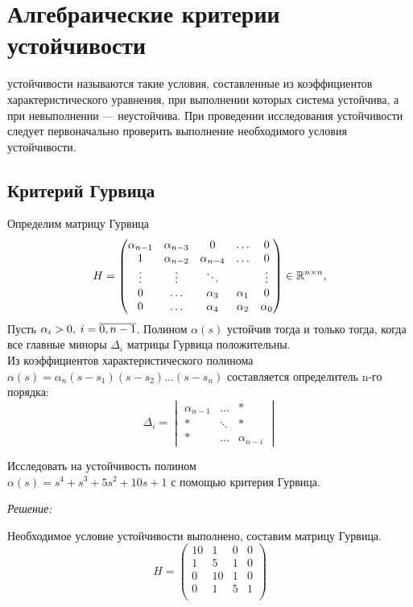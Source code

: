 \documentclass[../../TAU.tex]{subfiles}
\begin{document}
\section{Алгебраические критерии устойчивости}

     устойчивости называются такие  условия, составленные из коэффициентов характеристического уравнения, при выполнении которых система устойчива, а при невыполнении --- неустойчива. При проведении исследования устойчивости следует первоначально проверить выполнение необходимого условия устойчивости.

\subsection{Критерий Гурвица}

    Определим матрицу Гурвица
    $$
        H =\begin{pmatrix}
            \alpha_{n-1} & \alpha_{n-3} & 0 & \ldots & 0 \\
            1 & \alpha_{n-2} & \alpha_{n-4} & \ldots & 0 \\
            \vdots & \vdots & \ddots && \vdots \\
            0 & \ldots & \alpha_{3} & \alpha_1 & 0 \\
            0 & \ldots & \alpha_4 & \alpha_2 & \alpha_0
        \end{pmatrix}\in\mathbb{R}^{n\times n},
    $$
    \theor[Гурвица] Пусть 
    $\alpha_i>0,\; i=\overline{0,n-1}$.
    Полином $\alpha(s)$ устойчив тогда и только тогда, когда все главные миноры $\Delta_i$ матрицы Гурвица положительны. \\
    Из коэффициентов характеристического полинома 
    $\alpha(s)=\alpha_n(s-s_1) (s-s_2)\dots(s-s_n)$
    составляется определитель n-го порядка:
    $$
        \Delta_i =
        \begin{vmatrix}
            \alpha_{n-1}& \ldots& *\\
            *& \ddots & *\\
            *& \ldots & \alpha_{n-i}
        \end{vmatrix}
    $$

    \examp Исследовать на устойчивость полином\\
    $\alpha(s) = s^4+s^3+5s^2+10s+1$ 
    с помощью критерия Гурвица.

    {\it Решение:}\par
    Необходимое условие устойчивости выполнено, составим матрицу Гурвица.
    $$
        H = 
        \begin{pmatrix}
            10 & 1 & 0 & 0\\
            1 & 5 & 1 & 0 \\
            0 & 10 & 1 & 0\\
            0 & 1 & 5 & 1 \\
        \end{pmatrix}
    $$
\end{document}
